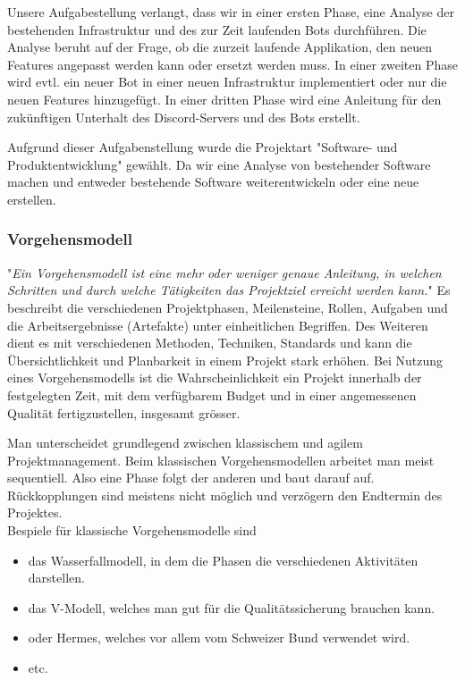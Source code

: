 \documentclass[a4paper, table]{article}
\begin{document}
Unsere Aufgabestellung verlangt, dass wir in einer ersten Phase, eine Analyse der bestehenden Infrastruktur und des zur Zeit laufenden Bots durchführen.
Die Analyse beruht auf der Frage, ob die zurzeit laufende Applikation, den neuen Features angepasst werden kann oder ersetzt werden muss.
In einer zweiten Phase wird evtl. ein neuer Bot in einer neuen Infrastruktur implementiert oder nur die neuen Features hinzugefügt.
In einer dritten Phase wird eine Anleitung für den zukünftigen Unterhalt des Discord-Servers und des Bots erstellt.

Aufgrund dieser Aufgabenstellung wurde die Projektart "Software- und Produktentwicklung" gewählt. Da wir eine Analyse von bestehender Software machen und
entweder bestehende Software weiterentwickeln oder eine neue erstellen.

\subsubsection{Vorgehensmodell}\label{Vorgehensmodell}
"\textit{Ein Vorgehensmodell ist eine mehr oder weniger genaue Anleitung, in welchen Schritten und durch welche Tätigkeiten das Projektziel
erreicht werden kann.}"\autocite{sarre_lufthansa-reservierung_2009}
Es beschreibt die verschiedenen Projektphasen, Meilensteine, Rollen, Aufgaben und die Arbeitsergebnisse (Artefakte) unter einheitlichen Begriffen.
Des Weiteren dient es mit verschiedenen Methoden, Techniken, Standards und kann die Übersichtlichkeit und Planbarkeit in einem Projekt stark erhöhen.
Bei Nutzung eines Vorgehensmodells ist die Wahrscheinlichkeit ein Projekt innerhalb der festgelegten Zeit, mit dem verfügbarem Budget und in einer
angemessenen Qualität fertigzustellen, insgesamt grösser. \autocite{jenny_projektmanagement_2016} %
\newline

Man unterscheidet grundlegend zwischen klassischem und agilem Projektmanagement.
Beim klassischen Vorgehensmodellen arbeitet man meist sequentiell.
Also eine Phase folgt der anderen und baut darauf auf.
Rückkopplungen sind meistens nicht möglich und verzögern den Endtermin des Projektes.\\
Bespiele für klassische Vorgehensmodelle sind
\begin{itemize}
    \item das Wasserfallmodell, in dem die Phasen die verschiedenen Aktivitäten darstellen.
    \item das V-Modell, welches man gut für die Qualitätssicherung brauchen kann.
    \item oder Hermes, welches vor allem vom Schweizer Bund verwendet wird.
    \item etc.
\end{itemize}
\end{document}
